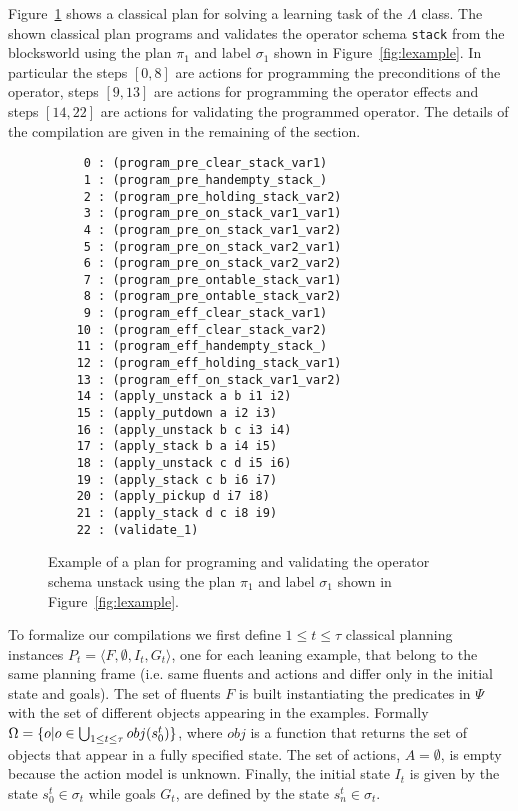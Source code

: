 \documentclass[letterpaper]{article} %
\newcommand{\tup}[1]{{\langle #1 \rangle}}
\begin{document}
Figure~\ref{fig:plan} shows a classical plan for solving a learning task of the $\Lambda$ class. The shown classical plan programs and validates the operator schema {\tt\small stack} from the blocksworld using the plan $\pi_1$ and label $\sigma_1$ shown in Figure~\ref{fig:lexample}. In particular the steps $[0,8]$ are actions for programming the preconditions of the operator, steps $[9,13]$ are actions for programming the operator effects and steps $[14,22]$ are actions for validating the programmed operator. The details of the compilation are given in the remaining of the section.

\begin{figure}[hbt]
\begin{footnotesize}
\begin{verbatim}
     0 : (program_pre_clear_stack_var1)
     1 : (program_pre_handempty_stack_)
     2 : (program_pre_holding_stack_var2)
     3 : (program_pre_on_stack_var1_var1)
     4 : (program_pre_on_stack_var1_var2)
     5 : (program_pre_on_stack_var2_var1)
     6 : (program_pre_on_stack_var2_var2)
     7 : (program_pre_ontable_stack_var1)
     8 : (program_pre_ontable_stack_var2)
     9 : (program_eff_clear_stack_var1)
    10 : (program_eff_clear_stack_var2)
    11 : (program_eff_handempty_stack_)
    12 : (program_eff_holding_stack_var1)
    13 : (program_eff_on_stack_var1_var2)
    14 : (apply_unstack a b i1 i2)
    15 : (apply_putdown a i2 i3)
    16 : (apply_unstack b c i3 i4)
    17 : (apply_stack b a i4 i5)
    18 : (apply_unstack c d i5 i6)
    19 : (apply_stack c b i6 i7)
    20 : (apply_pickup d i7 i8)
    21 : (apply_stack d c i8 i9)
    22 : (validate_1)
\end{verbatim}
\end{footnotesize}
 \caption{\small Example of a plan for programing and validating the operator schema unstack using the plan $\pi_1$ and label $\sigma_1$ shown in Figure~\ref{fig:lexample}.}
\label{fig:plan}
\end{figure}

To formalize our compilations we first define {\small $1\leq t\leq \tau$} classical planning instances $P_t=\tup{F,\emptyset,I_t,G_t}$, one for each leaning example, that belong to the same planning frame (i.e. same fluents and actions and differ only in the initial state and goals). The set of fluents $F$ is built instantiating the predicates in $\Psi$ with the set of different objects appearing in the examples. Formally $\Omega=\{o|o\in \bigcup_{\small 1\leq t\leq \tau} obj(s_0^t)\}$, where $obj$ is a function that returns the set of objects that appear in a fully specified state. The set of actions, $A=\emptyset$, is empty because the action model is unknown. Finally, the initial state $I_t$ is given by the state $s_0^t\in \sigma_t$ while goals $G_t$, are defined by the state $s_n^t\in \sigma_t$. 
\end{document}
